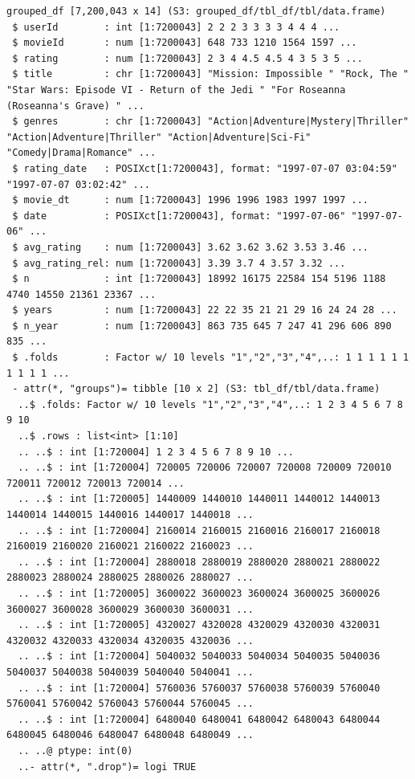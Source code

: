 \documentclass[
]{article}
\begin{document}
\begin{verbatim}
grouped_df [7,200,043 x 14] (S3: grouped_df/tbl_df/tbl/data.frame)
 $ userId        : int [1:7200043] 2 2 2 3 3 3 3 4 4 4 ...
 $ movieId       : num [1:7200043] 648 733 1210 1564 1597 ...
 $ rating        : num [1:7200043] 2 3 4 4.5 4.5 4 3 5 3 5 ...
 $ title         : chr [1:7200043] "Mission: Impossible " "Rock, The " "Star Wars: Episode VI - Return of the Jedi " "For Roseanna (Roseanna's Grave) " ...
 $ genres        : chr [1:7200043] "Action|Adventure|Mystery|Thriller" "Action|Adventure|Thriller" "Action|Adventure|Sci-Fi" "Comedy|Drama|Romance" ...
 $ rating_date   : POSIXct[1:7200043], format: "1997-07-07 03:04:59" "1997-07-07 03:02:42" ...
 $ movie_dt      : num [1:7200043] 1996 1996 1983 1997 1997 ...
 $ date          : POSIXct[1:7200043], format: "1997-07-06" "1997-07-06" ...
 $ avg_rating    : num [1:7200043] 3.62 3.62 3.62 3.53 3.46 ...
 $ avg_rating_rel: num [1:7200043] 3.39 3.7 4 3.57 3.32 ...
 $ n             : int [1:7200043] 18992 16175 22584 154 5196 1188 4740 14550 21361 23367 ...
 $ years         : num [1:7200043] 22 22 35 21 21 29 16 24 24 28 ...
 $ n_year        : num [1:7200043] 863 735 645 7 247 41 296 606 890 835 ...
 $ .folds        : Factor w/ 10 levels "1","2","3","4",..: 1 1 1 1 1 1 1 1 1 1 ...
 - attr(*, "groups")= tibble [10 x 2] (S3: tbl_df/tbl/data.frame)
  ..$ .folds: Factor w/ 10 levels "1","2","3","4",..: 1 2 3 4 5 6 7 8 9 10
  ..$ .rows : list<int> [1:10] 
  .. ..$ : int [1:720004] 1 2 3 4 5 6 7 8 9 10 ...
  .. ..$ : int [1:720004] 720005 720006 720007 720008 720009 720010 720011 720012 720013 720014 ...
  .. ..$ : int [1:720005] 1440009 1440010 1440011 1440012 1440013 1440014 1440015 1440016 1440017 1440018 ...
  .. ..$ : int [1:720004] 2160014 2160015 2160016 2160017 2160018 2160019 2160020 2160021 2160022 2160023 ...
  .. ..$ : int [1:720004] 2880018 2880019 2880020 2880021 2880022 2880023 2880024 2880025 2880026 2880027 ...
  .. ..$ : int [1:720005] 3600022 3600023 3600024 3600025 3600026 3600027 3600028 3600029 3600030 3600031 ...
  .. ..$ : int [1:720005] 4320027 4320028 4320029 4320030 4320031 4320032 4320033 4320034 4320035 4320036 ...
  .. ..$ : int [1:720004] 5040032 5040033 5040034 5040035 5040036 5040037 5040038 5040039 5040040 5040041 ...
  .. ..$ : int [1:720004] 5760036 5760037 5760038 5760039 5760040 5760041 5760042 5760043 5760044 5760045 ...
  .. ..$ : int [1:720004] 6480040 6480041 6480042 6480043 6480044 6480045 6480046 6480047 6480048 6480049 ...
  .. ..@ ptype: int(0) 
  ..- attr(*, ".drop")= logi TRUE
\end{verbatim}
\end{document}
